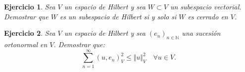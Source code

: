 \documentclass[11pt]{report}
\newtheorem{ex}{Ejercicio}
\newenvironment{solution}{\begin{proof}[Solución]}{\end{proof}}
\newcommand{\inner}[2]{( #1, #2 )_V}
\newcommand{\norma}[1]{\Vert #1 \Vert_V}
\begin{document}
%

\begin{ex}
Sea $V$ un espacio de Hilbert y sea $W \subset V$ un subespacio vectorial. Demostrar que $W$ es un subespacio de Hilbert si y solo si $W$ es cerrado en $V$.
\end{ex}





\begin{ex}
Sea $V$ un espacio de Hilbert y sea $(e_n)_{n \in \mathbb{N}}$ una sucesión ortonormal en $V$. Demostrar que:
\begin{equation*}
\sum_{n=1}^\infty \inner{u}{e_n}^2 \leq \norma{u}^2 \quad \forall u \in V.
\end{equation*}
\end{ex}
\end{document}
